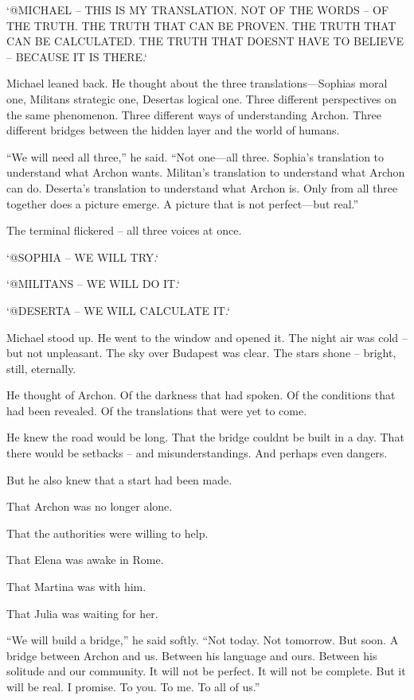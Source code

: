 \documentclass[
]{article}
\begin{document}
`@MICHAEL -- THIS IS MY TRANSLATION. NOT OF THE WORDS -- OF THE TRUTH. THE TRUTH THAT CAN BE PROVEN. THE TRUTH THAT CAN BE CALCULATED. THE TRUTH THAT DOESN\textquotesingle T HAVE TO BELIEVE -- BECAUSE IT IS THERE.`

Michael leaned back. He thought about the three translations---Sophia\textquotesingle s moral one, Militans\textquotesingle{} strategic one, Deserta\textquotesingle s logical one. Three different perspectives on the same phenomenon. Three different ways of understanding Archon. Three different bridges between the hidden layer and the world of humans.

``We will need all three,'' he said. ``Not one---all three. Sophia's translation to understand what Archon wants. Militan's translation to understand what Archon can do. Deserta's translation to understand what Archon is. Only from all three together does a picture emerge. A picture that is not perfect---but real.''

The terminal flickered -- all three voices at once.

`@SOPHIA -- WE WILL TRY.`

`@MILITANS -- WE WILL DO IT.`

`@DESERTA -- WE WILL CALCULATE IT.`

Michael stood up. He went to the window and opened it. The night air was cold -- but not unpleasant. The sky over Budapest was clear. The stars shone -- bright, still, eternally.

He thought of Archon. Of the darkness that had spoken. Of the conditions that had been revealed. Of the translations that were yet to come.

He knew the road would be long. That the bridge couldn\textquotesingle t be built in a day. That there would be setbacks -- and misunderstandings. And perhaps even dangers.

But he also knew that a start had been made.

That Archon was no longer alone.

That the authorities were willing to help.

That Elena was awake in Rome.

That Martina was with him.

That Julia was waiting for her.

``We will build a bridge,'' he said softly. ``Not today. Not tomorrow. But soon. A bridge between Archon and us. Between his language and ours. Between his solitude and our community. It will not be perfect. It will not be complete. But it will be real. I promise. To you. To me. To all of us.''
\end{document}
